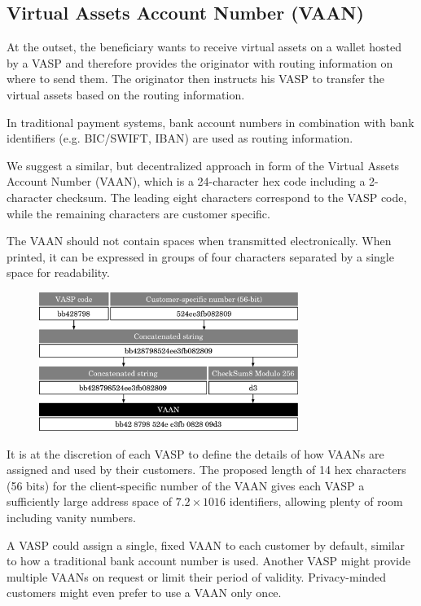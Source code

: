 \documentclass{article}
\begin{document}
\subsection{Virtual Assets Account Number (VAAN)}
At the outset, the beneficiary wants to receive virtual assets on a wallet hosted by a VASP and therefore provides the originator with routing information on where to send them. The originator then instructs his VASP to transfer the virtual assets based on the routing information.

In traditional payment systems, bank account numbers in combination with bank identifiers (e.g. BIC/SWIFT, IBAN) are used as routing information.

We suggest a similar, but decentralized approach in form of the Virtual Assets Account Number (VAAN), which is a 24-character hex code including a 2-character checksum. The leading eight characters correspond to the VASP code, while the remaining characters are customer specific.

The VAAN should not contain spaces when transmitted electronically. When printed, it can be expressed in groups of four characters separated by a single space for readability.

\begin{figure}[h]
    \centering
    \includegraphics[width=0.75\textwidth]{g2.pdf}
\end{figure}

It is at the discretion of each VASP to define the details of how VAANs are assigned and used by their customers. The proposed length of 14 hex characters (56 bits) for the client-specific number of the VAAN gives each VASP a sufficiently large address space of $7.2\times1016$ identifiers, allowing plenty of room including vanity numbers.

A VASP could assign a single, fixed VAAN to each customer by default, similar to how a traditional bank account number is used. Another VASP might provide multiple VAANs on request or limit their period of validity. Privacy-minded customers might even prefer to use a VAAN only once.
\end{document}
